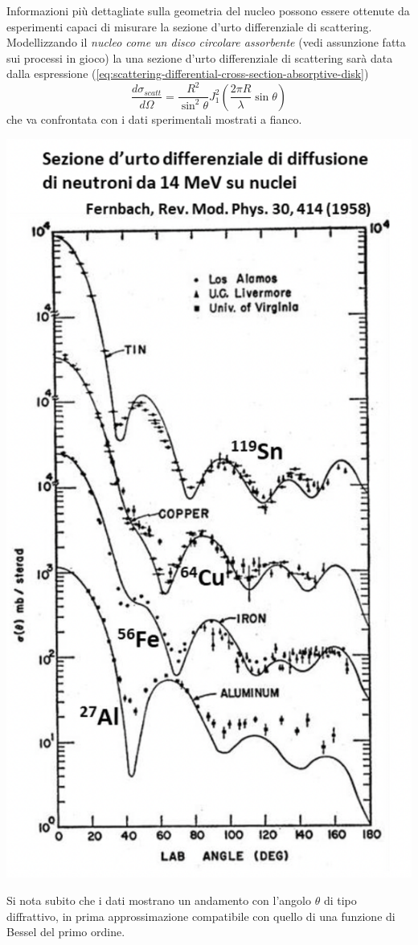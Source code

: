 Informazioni più dettagliate sulla geometria del nucleo possono essere ottenute da esperimenti capaci di misurare
la sezione d'urto differenziale di scattering.
Modellizzando il \emph{nucleo come un disco circolare assorbente} (vedi assunzione fatta sui processi in gioco)
la una sezione d'urto differenziale di scattering sarà data dalla espressione (\ref{eq:scattering-differential-cross-section-absorptive-disk})
\[
	\frac{d\sigma_{scatt}}{d \Omega} = \frac{R^{2}}{\sin ^{2}\theta}J_{1}^{2}\left( \frac{2 \pi R}{\lambda} \sin \theta \right)
\]
che va confrontata con i dati sperimentali mostrati a fianco.
\begin{marginfigure}
	\centering
	\includegraphics[width = 1.25 \textwidth,height = 1.25 \textheight]{figs/grafico-cross-sect-neutroni-2}
	\label{fig:cross-section-neutroni2}
\end{marginfigure}
Si nota subito che i dati mostrano un andamento con l'angolo $\theta$ di tipo diffrattivo, in prima approssimazione
compatibile con quello di una funzione di Bessel del primo ordine.

